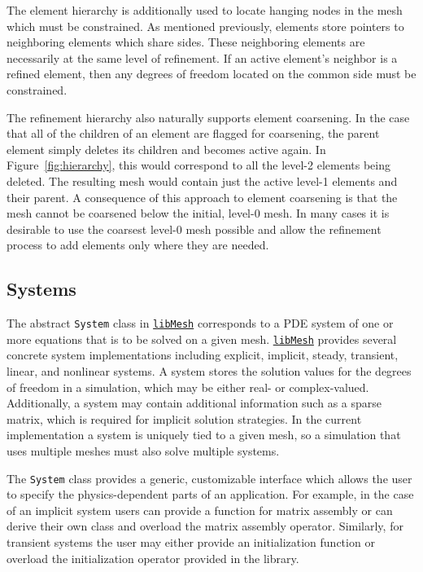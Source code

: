 \documentclass[global,twocolumn,final]{svjour}
\newcommand{\libMesh}{\href{http://libmesh.sourceforge.net}{\texttt{lib\-Mesh}}}
\newcommand{\ICESOnly}[1]{}     %
\begin{document}
The element hierarchy is additionally used to locate hanging nodes in
the mesh which must be constrained.  As mentioned previously, elements
store pointers to neighboring elements which share sides.  These
neighboring elements are necessarily at the same level of refinement.
If an active element's neighbor is a refined element, then any degrees
of freedom located on the common side must be constrained.

The refinement hierarchy also naturally supports element
coarsening. In the case that all of the children of an element are
flagged for coarsening, the parent element simply deletes its
children and becomes active again.
In Figure~\ref{fig:hierarchy}, this would correspond to all the
level-2 elements being deleted.  The resulting mesh would contain just
the active level-1 elements and their parent.  A consequence of this
approach to element coarsening is that the mesh cannot be coarsened
below the initial, level-0 mesh.  In many cases it is desirable to
use the coarsest level-0 mesh possible and allow the refinement
process to add elements only where they are needed.

\subsection{Systems}
The abstract \texttt{System} class in \libMesh{} corresponds to a PDE
system of one or more equations that is to be solved on a given mesh.
\libMesh{} provides several concrete system implementations including
explicit, implicit, steady, transient, linear, and nonlinear systems.
A system stores the solution values for the degrees of freedom in a
simulation, which may be either real- or complex-valued.  Additionally,
a system may contain additional information such as a sparse matrix,
which is required for implicit solution strategies.  In the current
implementation a system is uniquely tied to a given mesh, so a
simulation that uses multiple meshes must also solve multiple systems.

The \texttt{System} class provides a generic, customizable interface
which allows the user to specify the physics-dependent parts of an
application.  For example, in the case of an implicit system users can
provide a function for matrix assembly or can derive their own class
and overload the matrix assembly operator.  Similarly, for transient
systems the user may either provide an initialization function or
overload the initialization operator provided in the library.

\ICESOnly{
Subclasses of \texttt{System} are included in \libMesh, to provide
additional support for common problem types through supersets of the
base interface.  The \texttt{ExplicitSystem},
\texttt{LinearImplicitSystem}, \texttt{NonlinearImplicitSystem},
\texttt{EigenSystem}, \texttt{FrequencySystem}, and
\texttt{NewmarkSystem} each provide the extra data structures and code
required for their particular variety of PDE.
}
\end{document}
